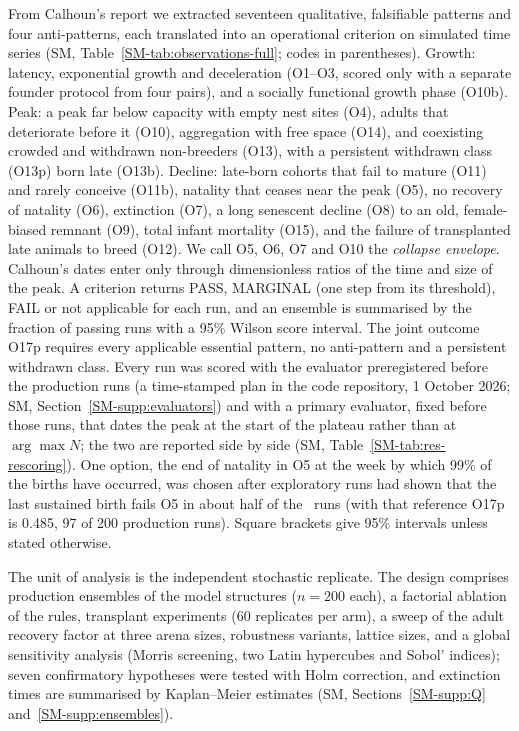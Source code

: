 From Calhoun's report we extracted seventeen qualitative, falsifiable patterns and four anti-patterns, each
translated into an operational criterion on simulated time series (SM, Table~\ref{SM-tab:observations-full}; codes
in parentheses). Growth: latency, exponential growth and deceleration (O1--O3, scored only with a separate founder
protocol from four pairs), and a socially functional growth phase (O10b). Peak: a peak far below capacity with empty
nest sites (O4), adults that deteriorate before it (O10), aggregation with free space (O14), and coexisting crowded
and withdrawn non-breeders (O13), with a persistent withdrawn class (O13p) born late (O13b). Decline: late-born
cohorts that fail to mature (O11) and rarely conceive (O11b), natality that ceases near the peak (O5), no recovery of
natality (O6), extinction (O7), a long senescent decline (O8) to an old, female-biased remnant (O9), total infant
mortality (O15), and the failure of transplanted late animals to breed (O12). We call O5, O6, O7 and O10 the
\emph{collapse envelope}. Calhoun's dates enter only through dimensionless ratios of the time and size of the peak.
A criterion returns PASS, MARGINAL (one step from its threshold), FAIL or not applicable for each run, and an
ensemble is summarised by the fraction of passing runs with a 95\% Wilson score interval. The joint
outcome O17p requires every applicable essential pattern, no anti-pattern and a persistent withdrawn class. Every run
was scored with the evaluator preregistered before the production runs (a time-stamped plan in the code repository,
1 October 2026; SM, Section~\ref{SM-supp:evaluators}) and with a primary evaluator, fixed before those runs, that dates the peak at the start of the plateau rather than at $\arg\max N$; the two are reported side
by side (SM, Table~\ref{SM-tab:res-rescoring}). One option, the end of natality in O5 at the week by which 99\% of the
births have occurred, was chosen after exploratory runs had shown that the last sustained birth fails O5 in about
half of the \Cone\ runs (with that reference O17p is 0.485, 97 of 200 production runs). Square brackets give 95\% intervals unless
stated otherwise.

The unit of analysis is the independent stochastic replicate. The design comprises production ensembles of the model
structures ($n=200$ each), a factorial ablation of the rules, transplant experiments ($60$ replicates per arm), a
sweep of the adult recovery factor at three arena sizes, robustness variants, lattice sizes, and a global
sensitivity analysis (Morris screening, two Latin hypercubes and Sobol' indices); seven
confirmatory hypotheses were tested with Holm correction, and extinction times are summarised by Kaplan--Meier
estimates (SM, Sections~\ref{SM-supp:Q} and~\ref{SM-supp:ensembles}).

